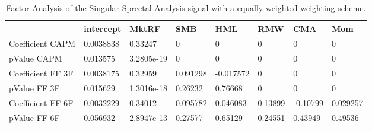 \begin{table}[H]
\centering
\begin{tabular}{llllllll}
\hline& intercept & MktRF & SMB & HML & RMW & CMA & Mom \\ 
\hline 
Coefficient CAPM & 0.0038838 & 0.33247 & 0 & 0 & 0 & 0 & 0 \\ 
pValue CAPM & 0.013575 & 3.2805e-19 & 0 & 0 & 0 & 0 & 0 \\ 
Coefficient FF 3F & 0.0038175 & 0.32959 & 0.091298 & -0.017572 & 0 & 0 & 0 \\ 
pValue FF 3F & 0.015629 & 1.3016e-18 & 0.26232 & 0.76668 & 0 & 0 & 0 \\ 
Coefficient FF 6F & 0.0032229 & 0.34012 & 0.095782 & 0.046083 & 0.13899 & -0.10799 & 0.029257 \\ 
pValue FF 6F & 0.056932 & 2.8947e-13 & 0.27577 & 0.65129 & 0.24551 & 0.43949 & 0.49536 \\ 
\hline
\end{tabular}
\caption{Factor Analysis of the Singular Sprectal Analysis signal with a equally weighted weighting scheme.}
\label{SSA_EW_FACTOR}
\end{table}
